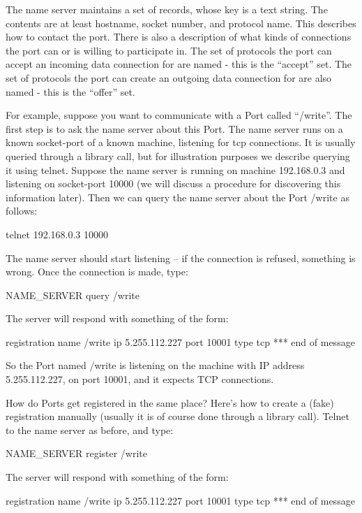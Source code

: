 \documentclass[a4]{article}
\begin{document}
The name server maintains a set of records, whose key is a text
string.  The contents are at least hostname, socket number, and
protocol name.  This describes how to contact the port.  There is also
a description of what kinds of connections the port can or is willing
to participate in.  The set of protocols the port can accept an
incoming data connection for are named - this is the ``accept'' set.
The set of protocols the port can create an outgoing data connection
for are also named - this is the ``offer'' set.

For example, suppose you want to communicate with a Port called
``/write''.  The first step is to ask the name server about this
Port.  The name server runs on a known socket-port of a known machine,
listening for tcp connections.
It is usually queried through a library call, but for illustration
purposes we describe
querying it using telnet.  Suppose the name server is running on
machine 192.168.0.3 and listening on socket-port 10000 (we will
discuss a procedure for discovering this information later).
Then we can query the name server about the Port /write as follows:


\begin{code}
telnet 192.168.0.3 10000
\end{code}
%
The name server should start listening -- if the connection is refused,
something is wrong.  Once the connection is made, type:
%
\begin{code}
NAME_SERVER query /write
\end{code}
%
The server will respond with something of the form:
%
\begin{code}
registration name /write ip 5.255.112.227 port 10001 type tcp
*** end of message
\end{code}
%
So the Port named /write is listening on the machine with
IP address 5.255.112.227, on port 10001, and it expects TCP
connections.

How do Ports get registered in the same place?  Here's how to create a
(fake) registration
manually (usually it is of course done through a library call).
Telnet to the name server as before, and type:
%
\begin{code}
NAME_SERVER register /write
\end{code}
%
The server will respond with something of the form:
%
\begin{code}
registration name /write ip 5.255.112.227 port 10001 type tcp
*** end of message
\end{code}
\end{document}
